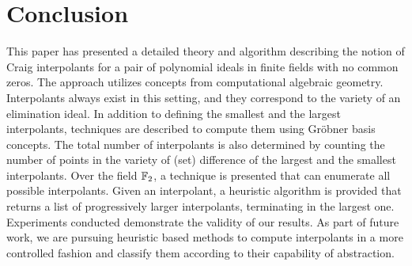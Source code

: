 \section{Conclusion}
\label{sec:conc}
This paper has presented a detailed theory and algorithm describing
the notion of Craig interpolants for a pair of polynomial ideals in
finite fields with no common zeros. The approach utilizes concepts
from computational algebraic geometry. Interpolants always exist in
this setting, and they correspond to the variety of an 
elimination ideal. In addition to defining the smallest and the largest
interpolants, techniques are described to compute them using Gr\"obner
basis concepts.  The total number of interpolants is also determined
by counting the number of points in the variety of (set) difference of
the largest and the smallest interpolants. Over the field ${\mathbb{F}}_2$, 
a technique is presented that can enumerate all possible interpolants. 
Given an interpolant, a heuristic algorithm is provided that 
returns a list of progressively larger interpolants, terminating in
the largest one. Experiments conducted demonstrate the validity of our
results. As part of future work, we are pursuing heuristic based 
methods to compute interpolants in a more controlled fashion and
classify them according to  their capability of abstraction. 
